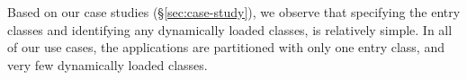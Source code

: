 
Based on our case studies (\S\ref{sec:case-study}),
we observe that specifying the entry classes and identifying any dynamically loaded classes,
is relatively simple.  %
In all of our use cases, the applications are partitioned with only one entry class, and very few dynamically loaded classes.



%




